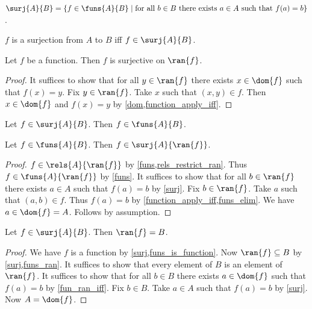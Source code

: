 \begin{definition}\label{surj}
    $\surj{A}{B} = \{f\in\funs{A}{B}\mid \text{for all $b\in B$ there exists $a\in A$ such that $f(a) = b$}\}$.
\end{definition}

\begin{abbreviation}\label{surjection_from_to}
    $f$ is a surjection from $A$ to $B$ iff $f\in\surj{A}{B}$.
\end{abbreviation}

\begin{lemma}\label{surjection_ran}
    Let $f$ be a function.
    Then $f$ is surjective on $\ran{f}$.
\end{lemma}
\begin{proof}
    It suffices to show that for all $y\in\ran{f}$ there exists $x\in\dom{f}$ such that $f(x) = y$.
    Fix $y\in\ran{f}$.
    Take $x$ such that $(x,y)\in f$.
    Then $x\in\dom{f}$ and $f(x) = y$ by \cref{dom,function_apply_iff}.
\end{proof}

\begin{lemma}\label{surj_to_fun}
    Let $f\in\surj{A}{B}$.
    Then $f\in\funs{A}{B}$.
\end{lemma}

\begin{lemma}\label{fun_to_surj}
    Let $f\in\funs{A}{B}$.
    Then $f\in\surj{A}{\ran{f}}$.
\end{lemma}
\begin{proof}
    $f\in\rels{A}{\ran{f}}$ by \cref{funs,rels_restrict_ran}.
    Thus $f\in\funs{A}{\ran{f}}$ by \cref{funs}.
    It suffices to show that for all $b\in\ran{f}$ there exists $a\in A$ such that $f(a) = b$ by \cref{surj}.
    Fix $b\in\ran{f}$.
    Take $a$ such that $(a,b)\in f$.
    Thus $f(a)=b$ by \cref{function_apply_iff,funs_elim}.
    We have $a\in\dom{f} = A$.
    Follows by assumption.
\end{proof}

\begin{corollary}\label{ran_of_surj}
    Let $f\in\surj{A}{B}$.
    Then $\ran{f} = B$.
\end{corollary}
\begin{proof}
    We have $f$ is a function by \cref{surj,funs_is_function}.
    Now $\ran{f}\subseteq B$ by \cref{surj,funs_ran}.
    It suffices to show that every element of $B$ is an element of $\ran{f}$.
    It suffices to show that for all $b\in B$
    there exists $a\in\dom{f}$ such that $f(a) = b$ by \cref{fun_ran_iff}.
    Fix $b\in B$.
    Take $a\in A$ such that $f(a) = b$ by \cref{surj}.
    Now $A=\dom{f}$.
\end{proof}

